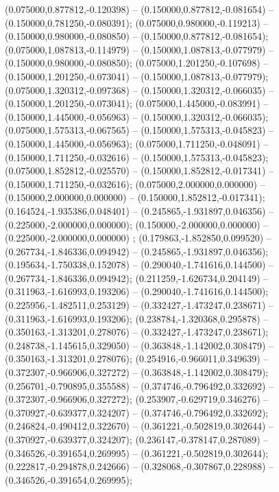 (0.075000,0.877812,-0.120398) -- (0.150000,0.877812,-0.081654) -- (0.150000,0.781250,-0.080391);
 (0.075000,0.980000,-0.119213) -- (0.150000,0.980000,-0.080850) -- (0.150000,0.877812,-0.081654);
 (0.075000,1.087813,-0.114979) -- (0.150000,1.087813,-0.077979) -- (0.150000,0.980000,-0.080850);
 (0.075000,1.201250,-0.107698) -- (0.150000,1.201250,-0.073041) -- (0.150000,1.087813,-0.077979);
 (0.075000,1.320312,-0.097368) -- (0.150000,1.320312,-0.066035) -- (0.150000,1.201250,-0.073041);
 (0.075000,1.445000,-0.083991) -- (0.150000,1.445000,-0.056963) -- (0.150000,1.320312,-0.066035);
 (0.075000,1.575313,-0.067565) -- (0.150000,1.575313,-0.045823) -- (0.150000,1.445000,-0.056963);
 (0.075000,1.711250,-0.048091) -- (0.150000,1.711250,-0.032616) -- (0.150000,1.575313,-0.045823);
 (0.075000,1.852812,-0.025570) -- (0.150000,1.852812,-0.017341) -- (0.150000,1.711250,-0.032616);
 (0.075000,2.000000,0.000000) -- (0.150000,2.000000,0.000000) -- (0.150000,1.852812,-0.017341);
 (0.164524,-1.935386,0.048401) -- (0.245865,-1.931897,0.046356) -- (0.225000,-2.000000,0.000000);
 (0.150000,-2.000000,0.000000) -- (0.225000,-2.000000,0.000000) ;
 (0.179863,-1.852850,0.099520) -- (0.267734,-1.846336,0.094942) -- (0.245865,-1.931897,0.046356);
 (0.195634,-1.750338,0.152078) -- (0.290040,-1.741616,0.144500) -- (0.267734,-1.846336,0.094942);
 (0.211259,-1.626734,0.204149) -- (0.311963,-1.616993,0.193206) -- (0.290040,-1.741616,0.144500);
 (0.225956,-1.482511,0.253129) -- (0.332427,-1.473247,0.238671) -- (0.311963,-1.616993,0.193206);
 (0.238784,-1.320368,0.295878) -- (0.350163,-1.313201,0.278076) -- (0.332427,-1.473247,0.238671);
 (0.248738,-1.145615,0.329050) -- (0.363848,-1.142002,0.308479) -- (0.350163,-1.313201,0.278076);
 (0.254916,-0.966011,0.349639) -- (0.372307,-0.966906,0.327272) -- (0.363848,-1.142002,0.308479);
 (0.256701,-0.790895,0.355588) -- (0.374746,-0.796492,0.332692) -- (0.372307,-0.966906,0.327272);
 (0.253907,-0.629719,0.346276) -- (0.370927,-0.639377,0.324207) -- (0.374746,-0.796492,0.332692);
 (0.246824,-0.490412,0.322670) -- (0.361221,-0.502819,0.302644) -- (0.370927,-0.639377,0.324207);
 (0.236147,-0.378147,0.287089) -- (0.346526,-0.391654,0.269995) -- (0.361221,-0.502819,0.302644);
 (0.222817,-0.294878,0.242666) -- (0.328068,-0.307867,0.228988) -- (0.346526,-0.391654,0.269995);
